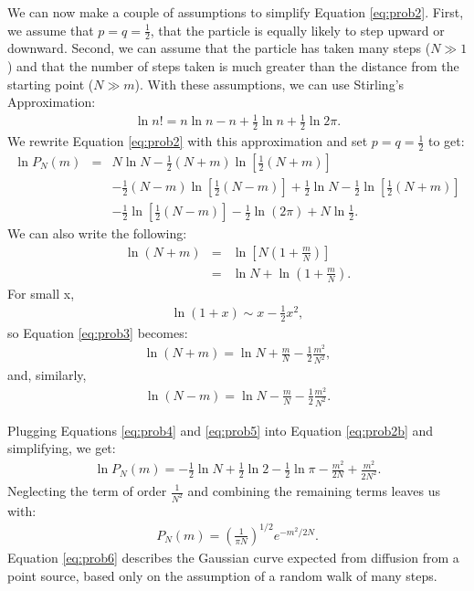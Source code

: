 \documentclass[draft, jgrga]{AGUTeX}
\begin{document}
\begin{article}
We can now make a couple of assumptions to simplify Equation \ref{eq:prob2}. First, we assume that $p=q= \frac{1}{2}$, that the particle is equally likely to step upward or downward. Second, we can assume that the particle has taken many steps ($N \gg 1$) and that the number of steps taken is much greater than the distance from the starting point ($N \gg m$). With these assumptions, we can use Stirling's Approximation:
\begin{eqnarray}
\ln n! = n \ln n - n + \frac{1}{2} \ln n + \frac{1}{2} \ln 2 \pi.
\end{eqnarray}
We rewrite Equation \ref{eq:prob2} with this approximation and set \begin{math} p = q= \frac{1}{2} \end{math} to get:
\begin{eqnarray}
\ln P_N(m) & = & N \ln N - \frac{1}{2} (N+m) \ln \left[\frac{1}{2}(N+m)\right] \nonumber \\
&  & - \frac{1}{2}(N - m) \ln\left[\frac{1}{2}(N-m)\right]+\frac{1}{2}\ln N - \frac{1}{2}\ln
\left[\frac{1}{2}(N+m)\right] \nonumber \\
&  & - \frac{1}{2} \ln\left[\frac{1}{2}(N-m)\right]- \frac{1}{2} \ln(2 \pi) + N \ln \frac{1}{2}. \label{eq:prob2b}
\end{eqnarray}
We can also write the following:
\begin{eqnarray}
  \label{eq:prob3}
\ln(N+m) & = & \ln \left[ N \left( 1 + \frac{m}{N} \right)\right] \nonumber \\
 & = & \ln N + \ln \left(1+\frac{m}{N}\right).
\end{eqnarray}
For small x,
\begin{eqnarray}
\ln(1+x) \sim x - \frac{1}{2}x^2, \nonumber
\end{eqnarray}
so Equation \ref{eq:prob3} becomes:
\begin{eqnarray}
  \label{eq:prob4}
\ln(N+m) = \ln N + \frac{m}{N} - \frac{1}{2}\frac{m^2}{N^2},
\end{eqnarray}
and, similarly,
\begin{eqnarray}
  \label{eq:prob5}
\ln(N-m) = \ln N - \frac{m}{N} - \frac{1}{2}\frac{m^2}{N^2}.
\end{eqnarray}

Plugging Equations \ref{eq:prob4} and \ref{eq:prob5} into Equation \ref{eq:prob2b} and simplifying, we get:
 \begin{eqnarray}
 \ln P_N(m) = - \frac{1}{2} \ln N + \frac{1}{2} \ln 2 - \frac{1}{2} \ln \pi
- \frac{m^2}{2N} + \frac {m^2}{2N^2}.
\end{eqnarray}
Neglecting the term of order \begin{math} \frac{1}{N^2} \end{math} and combining the remaining terms leaves us with:
\begin{eqnarray}
\label{eq:prob6}
P_N(m) = \left( \frac{1}{\pi N} \right)^{1/2} e^{-m^2/2N}.
\end{eqnarray}
Equation \ref{eq:prob6} describes the Gaussian curve expected from diffusion from a point source, based only on the assumption of a random walk of many steps.


\end{article}
\end{document}
